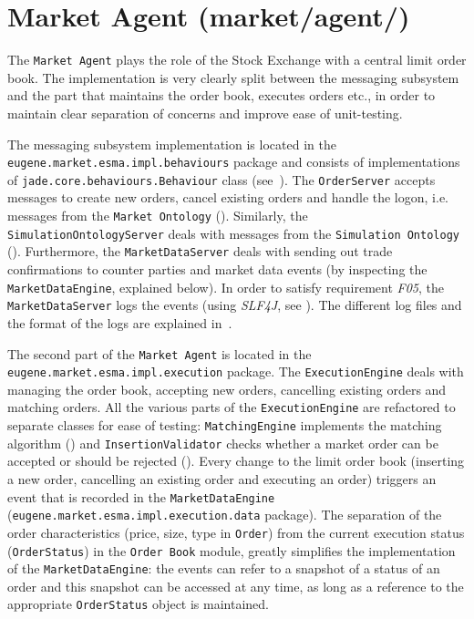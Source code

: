 \section{Market Agent (market/agent/)}
\label{Chapters/Implementation/Market-Agent}
The \texttt{Market Agent} plays the role of the Stock Exchange with a central limit order book. The implementation is very clearly split between the messaging subsystem and the part that maintains the order book, executes orders etc., in order to maintain clear separation of concerns and improve ease of unit-testing. 

The messaging subsystem implementation is located in the \\\texttt{eugene.market.esma.impl.behaviours} package and consists of implementations of \texttt{jade.core.behaviours.Behaviour} class (see~). The \texttt{OrderServer} accepts messages to create new orders, cancel existing orders and handle the logon, i.e. messages from the \texttt{Market Ontology} (). Similarly, the \texttt{SimulationOntologyServer} deals with messages from the \texttt{Simulation Ontology} (). Furthermore, the \texttt{MarketDataServer} deals with sending out trade confirmations to counter parties and market data events (by inspecting the \texttt{MarketDataEngine}, explained below). In order to satisfy requirement \textit{F05}, the \texttt{MarketDataServer} logs the events (using \textit{SLF4J}, see ). The different log files and the format of the logs are explained in~.

The second part of the \texttt{Market Agent} is located in the \\ \texttt{eugene.market.esma.impl.execution} package. The \texttt{ExecutionEngine} deals with managing the order book, accepting new orders, cancelling existing orders and matching orders. All the various parts of the \texttt{ExecutionEngine} are refactored to separate classes for ease of testing: \texttt{MatchingEngine} implements the matching algorithm () and \texttt{InsertionValidator} checks whether a market order can be accepted or should be rejected (). Every change to the limit order book (inserting a new order, cancelling an existing order and executing an order) triggers an event that is recorded in the \texttt{MarketDataEngine} (\texttt{eugene.market.esma.impl.execution.data} package). The separation of the order characteristics (price, size, type in \texttt{Order}) from the current execution status (\texttt{OrderStatus}) in the \texttt{Order Book} module, greatly simplifies the implementation of the \texttt{MarketDataEngine}: the events can refer to a snapshot of a status of an order and this snapshot can be accessed at any time, as long as a reference to the appropriate \texttt{OrderStatus} object is maintained. 

